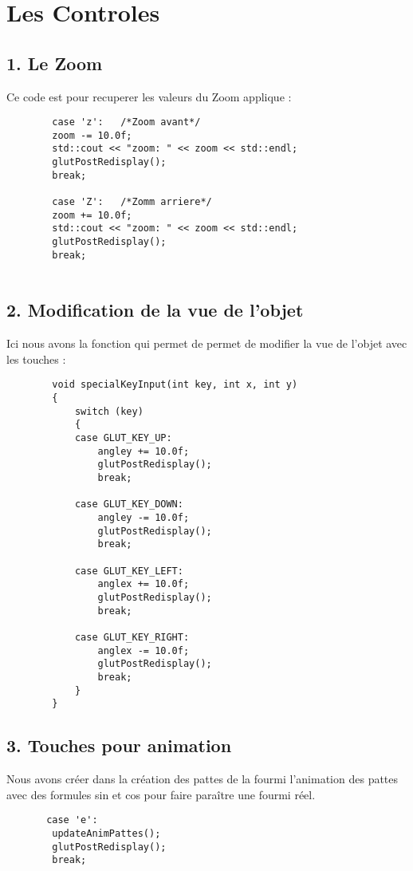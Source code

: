 \documentclass[11pt]{article}
\begin{document}
    \section*{\Large{Les Controles}}
    
     \subsection*{1. Le Zoom}
     Ce code est pour recuperer les valeurs du Zoom applique : 
     \begin{lstlisting}
        case 'z':   /*Zoom avant*/
        zoom -= 10.0f;
        std::cout << "zoom: " << zoom << std::endl;
        glutPostRedisplay();
        break;

        case 'Z':   /*Zomm arriere*/
        zoom += 10.0f;
        std::cout << "zoom: " << zoom << std::endl;
        glutPostRedisplay();
        break;
     
     \end{lstlisting}
     
     \subsection*{2. Modification de la vue de l'objet}
     Ici nous avons la fonction qui permet de permet de modifier la vue de l'objet avec les touches :
      \begin{lstlisting}
        void specialKeyInput(int key, int x, int y)
        {
            switch (key)
            {
            case GLUT_KEY_UP:
                angley += 10.0f;
                glutPostRedisplay();
                break;
        
            case GLUT_KEY_DOWN:
                angley -= 10.0f;
                glutPostRedisplay();
                break;
        
            case GLUT_KEY_LEFT:
                anglex += 10.0f;
                glutPostRedisplay();
                break;
        
            case GLUT_KEY_RIGHT:
                anglex -= 10.0f;
                glutPostRedisplay();
                break;
            }
        }
    \end{lstlisting}
     
     
\newpage     
\subsection*{3. Touches pour animation}
Nous avons créer dans la création des pattes de la fourmi l'animation des pattes avec des formules sin et cos pour faire paraître une fourmi réel.
\begin{lstlisting}
       case 'e':
        updateAnimPattes();
        glutPostRedisplay();
        break;
\end{lstlisting}
\end{document}
